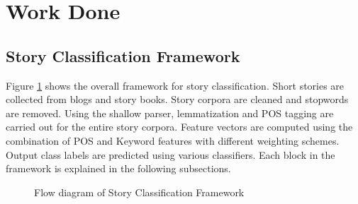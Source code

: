 \documentclass[times, 11pt, a4paper]{article}
\begin{document}
\section{Work Done}



\subsection{Story Classification Framework} \label{Story classification Framework}

Figure \ref{system} shows the overall framework for story classification. Short stories are collected from blogs and story books. Story corpora are cleaned and stopwords are removed. Using the shallow parser, lemmatization and POS tagging are carried out for the entire story corpora. Feature vectors are computed using the combination of POS and Keyword features with different weighting schemes. Output class labels are predicted using various classifiers. Each block in the framework is explained in the following subsections.

\vspace{0.5cm}

\begin{figure}[h] 
\centering
{}
\centering
\caption{Flow diagram of Story Classification Framework}
\label{system}
\end{figure}

\newpage
\end{document}
